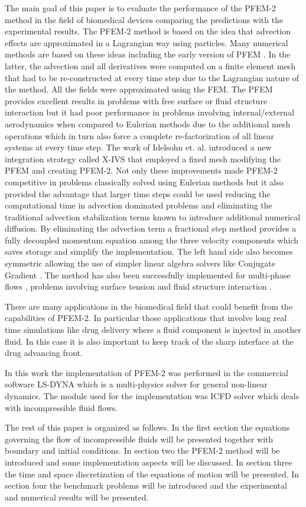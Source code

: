 The main goal of this paper is to evaluate the performance of the PFEM-2 method in the field of biomedical devices comparing the predictions with the experimental results. The PFEM-2 method is based on the idea that advection effects are approximated in a Lagrangian way using particles. Many numerical methods are based on these ideas \cite{sph,pic,mac,mps,mpm} including the early version of PFEM \cite{sergio:pfem}. In the latter, the advection and all derivatives were computed on a finite element mesh that had to be re-constructed at every time step due to the Lagrangian nature of the method. All the fields were approximated using the FEM. The PFEM provides excellent results in problems with free surface or fluid structure interaction but it had poor performance in problems involving internal/external aerodynamics when compared to Eulerian methods due to the additional mesh operations which in turn also force a complete re-factorization of all linear systems at every time step. The work of Idelsohn et. al. \cite{sergio:xivs1,sergio:xivs2} introduced a new integration strategy called X-IVS that employed a fixed mesh modifying the PFEM and creating PFEM-2. Not only these improvements made PFEM-2 competitive in problems classically solved using Eulerian methods but it also provided the advantage that larger time steps could be used \cite{gimenez:parallel} reducing the computational time in advection dominated problems and eliminating the traditional advection stabilization terms known to introduce additional numerical diffusion. By eliminating the advection term a fractional step method provides a fully decoupled momentum equation among the three velocity components which saves storage and simplify the implementation. The left hand side also becomes symmetric allowing the use of simpler linear algebra solvers like Conjugate Gradient \cite{conjgrad}. The method has also been successfully implemented for multi-phase flows \cite{sergio:pfem2_lts,gimenez:fs,gimenez:tesis}, problems involving surface tension \cite{gimenez:st} and fluid structure interaction \cite{pablo:FSI}.

There are many applications in the biomedical field that could benefit from the capabilities of PFEM-2. In particular those applications that involve long real time simulations like drug delivery where a fluid component is injected in another fluid. In this case it is also important to keep track of the sharp interface at the drug advancing front.

In this work the implementation of PFEM-2 was performed in the commercial software LS-DYNA\textsuperscript{\textregistered} \cite{lsdyna} which is a multi-physics solver for general non-linear dynamics. The module used for the implementation was ICFD solver which deals with incompressible fluid flows. 

The rest of this paper is organized as follows. 
In the first section the equations governing the flow of incompressible fluids will be presented together with boundary and initial conditions. 
In section two the PFEM-2 method will be introduced and some implementation aspects will be discussed.
In section three the time and space discretization of the equations of motion will be presented. 
In section four the benchmark problems will be introduced and the experimental and numerical results will be presented.
